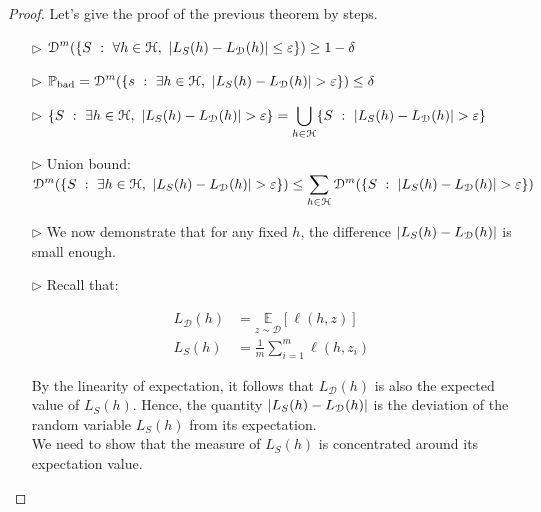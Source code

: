 \documentclass[../../main/main.tex]{subfiles}
\begin{document}
\begin{proof}
    Let's give the proof of the previous theorem by steps.
    \begin{itemize}
        \item[$\triangleright$]
            \( \displaystyle \mathcal{D}^m (\{ S \ : \ \forall h \in \mathcal{H}, \ \abs{L_S(h) - L_{\mathcal{D}}(h)} \le \varepsilon \})
            \ge
            1 - \delta \)

        \item[$\triangleright$]
            \( \displaystyle \mathbb{P}_{\text{bad}}
            =
            \mathcal{D}^m (\{ s \ : \ \exists h \in \mathcal{H}, \ \abs{L_S(h) - L_{\mathcal{D}}(h)} > \varepsilon \})
            \le
            \delta \)

        \item[$\triangleright$]
            \( \displaystyle \{ S \ : \ \exists h \in \mathcal{H}, \ \abs{L_S(h) - L_{\mathcal{D}}(h)} > \varepsilon \}
            =
            \bigcup\limits_{h \in \mathcal{H}} \{ S \ : \ \abs{L_S(h) - L_{\mathcal{D}}(h)} > \varepsilon \} \)

        \item[$\triangleright$] Union bound:\\
            \( \displaystyle \mathcal{D}^m (\{ S \ : \ \exists h \in \mathcal{H}, \ \abs{L_S(h) - L_{\mathcal{D}}(h)} > \varepsilon \})
            \le
            \sum_{h \in \mathcal{H}} \mathcal{D}^m (\{ S \ : \ \abs{L_S(h) - L_{\mathcal{D}}(h)} > \varepsilon \}) \)

        \item[$\triangleright$] We now demonstrate that for any fixed \( h \), the difference \( \abs{L_S(h) - L_{\mathcal{D}}(h)} \) is small enough.

        \item[$\triangleright$] Recall that:

            \begin{align*}
                L_{\mathcal{D}}(h)  &= \underset{z \sim \mathcal{D}}{\mathbb{E}}[\ell(h,z)]  \\
                L_S(h)              &= \frac{1}{m} \sum_{i=1}^{m} \ell(h,z_i)
            \end{align*}

            By the linearity of expectation, it follows that \( L_{\mathcal{D}}(h) \) is also the expected value of \( L_S(h) \). Hence, the quantity \( \abs{L_S(h) - L_{\mathcal{D}}(h)} \) is the deviation of the random variable \( L_S(h) \) from its expectation.\\
            We need to show that the measure of \( L_S(h) \) is concentrated around its expectation value.


\end{itemize}
\end{proof}
\end{document}
